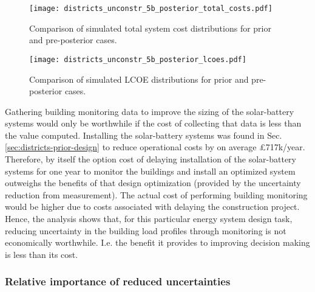\begin{figure}[h]
    \centering
    \texttt{[image: districts\_unconstr\_5b\_posterior\_total\_costs.pdf]}
    \caption{Comparison of simulated total system cost distributions for prior and pre-posterior cases.}
    \label{fig:districts-posterior-costs}
\end{figure}

\begin{figure}[h]
    \centering
    \texttt{[image: districts\_unconstr\_5b\_posterior\_lcoes.pdf]}
    \caption{Comparison of simulated LCOE distributions for prior and pre-posterior cases.}
    \label{fig:districts-posterior-lcoes}
\end{figure}

\newpage
Gathering building monitoring data to improve the sizing of the solar-battery systems would only be worthwhile if the cost of collecting that data is less than the  value computed.
Installing the solar-battery systems was found in Sec. \ref{sec:districts-prior-design} to reduce operational costs by on average £717k/year. Therefore, by itself the option cost of delaying installation of the solar-battery systems for one year to monitor the buildings and install an optimized system outweighs the benefits of that design optimization (provided by the uncertainty reduction from measurement). The actual cost of performing building monitoring would be higher due to costs associated with delaying the construction project. Hence, the  analysis shows that, for this particular energy system design task, reducing uncertainty in the building load profiles through monitoring is not economically worthwhile. I.e. the benefit it provides to improving decision making is less than its cost.

\newpage
\subsubsection{Relative importance of reduced uncertainties} \label{sec:districts-contributions}


